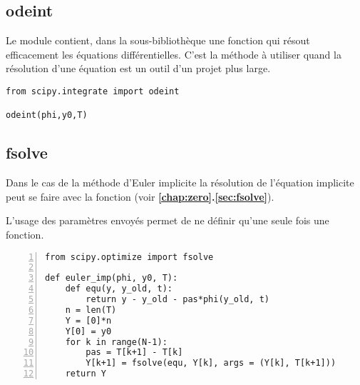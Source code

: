 \subsection{odeint}
Le module  contient, dans la sous-bibliothèque  une fonction  qui résout efficacement les équations différentielles. C'est la méthode à utiliser quand la résolution d'une équation est un outil d'un projet plus large.
\begin{lstlisting}
from scipy.integrate import odeint

odeint(phi,y0,T)
\end{lstlisting}
\subsection{fsolve}
Dans le cas de la méthode d'Euler implicite la résolution de l'équation implicite peut se faire avec la fonction  (voir {\bf \ref{chap:zero}.\ref{sec:fsolve}}). 

L'usage des paramètres envoyés permet de ne définir qu'une seule fois une fonction.
\begin{lstlisting}[numbers=left, caption=Euler implicite avec \type{fsolve}]
from scipy.optimize import fsolve

def euler_imp(phi, y0, T):
    def equ(y, y_old, t):
        return y - y_old - pas*phi(y_old, t)
    n = len(T)   
    Y = [0]*n            
    Y[0] = y0 
    for k in range(N-1):  
        pas = T[k+1] - T[k]
        Y[k+1] = fsolve(equ, Y[k], args = (Y[k], T[k+1]))
    return Y
\end{lstlisting}

